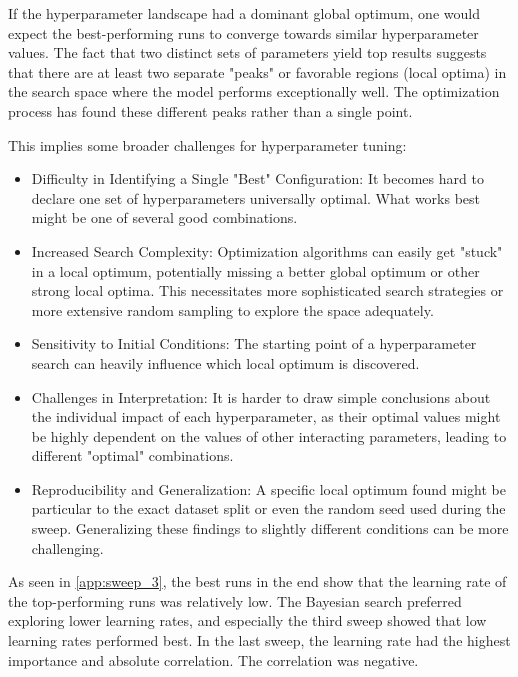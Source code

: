 If the hyperparameter landscape had a dominant global optimum, one would expect the best-performing runs to converge towards similar hyperparameter values. The fact that two distinct sets of parameters yield top results suggests that there are at least two separate "peaks" or favorable regions (local optima) in the search space where the model performs exceptionally well. The optimization process has found these different peaks rather than a single point.

This implies some broader challenges for hyperparameter tuning:

\begin{itemize}
    \item Difficulty in Identifying a Single "Best" Configuration: It becomes hard to declare one set of hyperparameters universally optimal. What works best might be one of several good combinations.
    \item Increased Search Complexity: Optimization algorithms can easily get "stuck" in a local optimum, potentially missing a better global optimum or other strong local optima. This necessitates more sophisticated search strategies or more extensive random sampling to explore the space adequately.
    \item Sensitivity to Initial Conditions: The starting point of a hyperparameter search can heavily influence which local optimum is discovered.
    \item Challenges in Interpretation: It is harder to draw simple conclusions about the individual impact of each hyperparameter, as their optimal values might be highly dependent on the values of other interacting parameters, leading to different "optimal" combinations.
    \item Reproducibility and Generalization: A specific local optimum found might be particular to the exact dataset split or even the random seed used during the sweep. Generalizing these findings to slightly different conditions can be more challenging.
\end{itemize}



As seen in \autoref{app:sweep_3}, the best runs in the end show that the learning rate of the top-performing runs was relatively low. The Bayesian search preferred exploring lower learning rates, and especially the third sweep showed that low learning rates performed best. In the last sweep, the learning rate had the highest importance and absolute correlation. The correlation was negative. 

